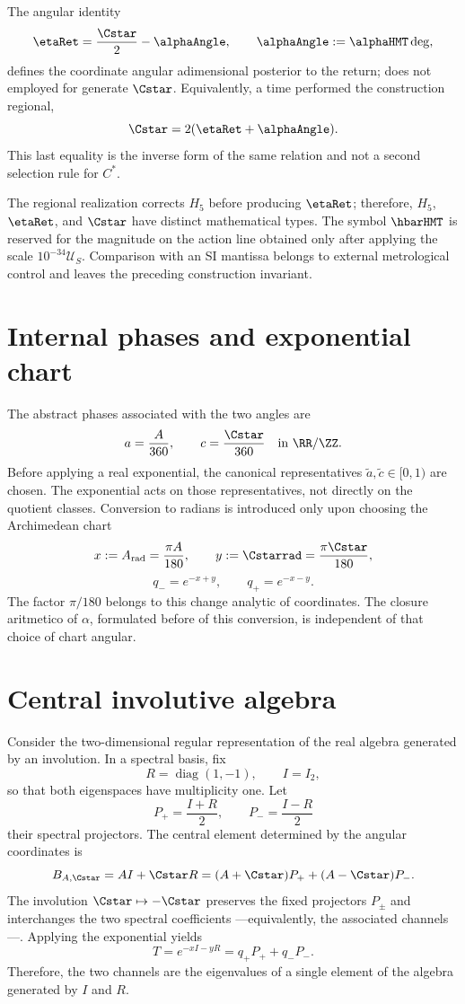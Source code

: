 The
angular identity
\[
 \etaRet=\frac{\Cstar}{2}-\alphaAngle,
 \qquad
 \alphaAngle:=\alphaHMT\,{\rm deg},
\]
defines the coordinate angular adimensional posterior to the return; does not  employed
for generate \(\Cstar\). Equivalently,
a time performed the construction regional,
\[
 \Cstar=2(\etaRet+\alphaAngle).
\]
This last equality is the inverse form of the same relation and not a
second selection rule for \(C^*\).

The regional realization corrects \(H_5\) before producing \(\etaRet\); therefore,
\(H_5\), \(\etaRet\), and \(\Cstar\) have distinct mathematical types. The symbol
\(\hbarHMT\) is reserved for the magnitude on the action line obtained only
after applying the scale \(10^{-34}\mathcal U_S\). Comparison with an SI mantissa belongs
to external metrological control and leaves the preceding construction invariant.

\section{Internal phases and exponential chart}

The abstract phases associated with the two angles are
\[
 a=\frac A{360},\qquad c=\frac{\Cstar}{360}
 \quad\text{in }\RR/\ZZ.
\]
Before applying a real exponential, the canonical representatives
\(\widetilde a,\widetilde c\in[0,1)\) are chosen. The exponential acts on those
representatives, not directly on the quotient classes.
Conversion to radians is introduced only upon choosing the
Archimedean chart
\[
 x:=A_{\rm rad}=\frac{\pi A}{180},\qquad
 y:=\Cstarrad=\frac{\pi\Cstar}{180},
\]
\[
 q_-=e^{-x+y},\qquad q_+=e^{-x-y}.
\]
The factor \(\pi/180\) belongs to this change analytic of coordinates. The
closure aritmetico of \(\alpha\), formulated before of this conversion, is
independent of that choice of chart angular.

\section{Central involutive algebra}

Consider the two-dimensional regular representation of the real algebra
generated by an involution. In a spectral basis, fix
\[
 R=\operatorname{diag}(1,-1),\qquad I=I_2,
\]
so that both eigenspaces have multiplicity one. Let
\[
 P_+=\frac{I+R}{2},\qquad P_-=\frac{I-R}{2}
\]
their spectral projectors. The central element determined by the
angular coordinates is
\[
 B_{A,\Cstar}=AI+\Cstar R
 =(A+\Cstar)P_++(A-\Cstar)P_-.
\]
The involution \(\Cstar\mapsto-\Cstar\) preserves the fixed projectors
\(P_\pm\) and interchanges the two spectral coefficients ---equivalently,
the associated channels---. Applying the exponential yields
\[
 T=e^{-xI-yR}=q_+P_++q_-P_-.
\]
Therefore, the two channels are the eigenvalues of a single element of the
algebra generated by \(I\) and \(R\).

